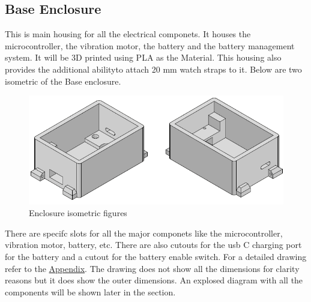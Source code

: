 \documentclass[12pt, titlepage]{article}
\begin{document}
\subsection{Base Enclosure}
This is main housing for all the electrical componets. It houses the microcontroller, the vibration motor, the battery and the battery management system. It will be 3D printed using PLA as the Material. This housing also provides the additional abilityto attach 20 mm watch straps to it.
Below are two isometric of the Base enclosure. 
\begin{figure}[H]
  \includegraphics[width=\textwidth,height=\textheight,keepaspectratio]{Base_ISO.png}
  \caption{Enclosure isometric figures}
  \label{EnclosureISO} 
\end{figure}
There are specifc slots for all the major componets like the microcontroller, vibration motor, battery, etc. There are also cutouts for the usb C charging port for the battery and a cutout for the battery enable switch. For a detailed drawing refer to the \hyperref[appendix:hardware:enclosureDWG]{Appendix}. The drawing does not show all the dimensions for clarity reasons but it does show the outer dimensions. An explosed diagram with all the components will be shown later in the section. 
 
\end{document}
